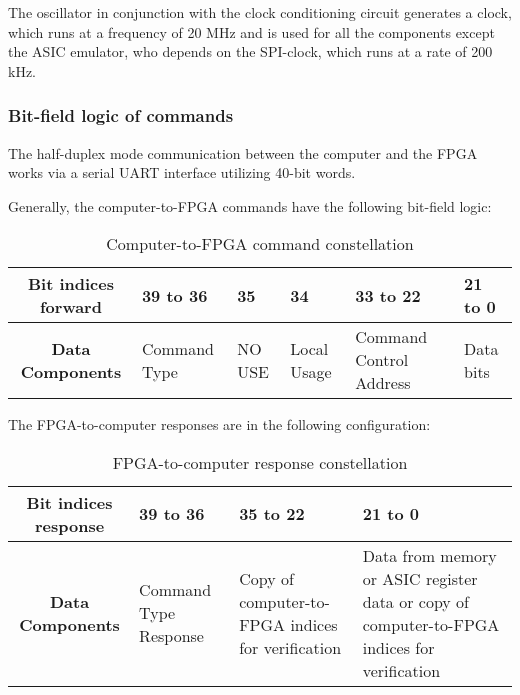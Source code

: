 The oscillator in conjunction with the clock conditioning circuit generates a clock, which runs at a frequency of 20 MHz and is used for all the components except the ASIC emulator, who depends on the SPI-clock, which runs at a rate of 200 kHz.

\subsubsection{Bit-field logic of commands}
The half-duplex mode communication between the computer and the FPGA works via a serial UART interface utilizing 40-bit words.
\newline

Generally, the computer-to-FPGA commands have the following bit-field logic:

\begin{table}[H]

\caption[]{Computer-to-FPGA command constellation}
    \label{tab:4}
    
  \begin{center}  
  \begin{tabular}{|c|p{2cm}|p{2cm}|p{2.5cm}|p{2cm}|p{2cm}|}
  \hline
  \textbf{Bit indices forward}  & 39 to 36  & 35 & 34 & 33 to 22 & 21 to 0\\ 
  \hline
  \textbf{Data Components} & Command \newline Type & NO USE & Local Usage & Command Control Address & Data bits \\
  \hline
  
\end{tabular}
\end{center}
\end{table}

The FPGA-to-computer responses are in the following configuration:


\begin{table}[H]

\caption[]{FPGA-to-computer response constellation}
    \label{tab:5}
    
  \begin{center}  
  \begin{tabular}{|c|p{3cm}|p{3cm}|p{3cm}|}
  \hline
  \textbf{Bit indices response}  & 39 to 36  & 35 to 22 & 21 to 0 \\ 
  \hline
  \textbf{Data Components} & Command Type Response & Copy of computer-to-FPGA indices for verification & Data from memory or ASIC register data or copy of computer-to-FPGA indices for verification \\
  \hline
  
\end{tabular}
\end{center}
\end{table}

